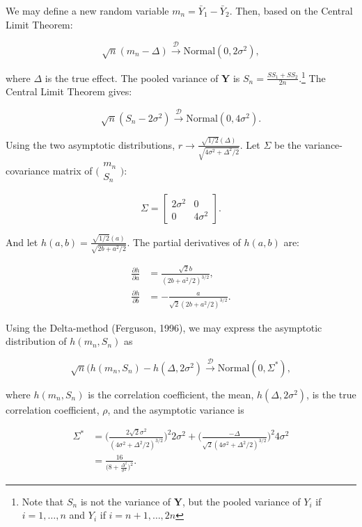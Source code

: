 \documentclass[english,,man]{apa6}
\begin{document}
We may define a new random variable \(m_n = \bar{Y}_1 - \bar{Y}_2\). Then, based on the Central Limit Theorem:

\[\sqrt{n}(m_n - \Delta) \stackrel{\mathscr{D}}{\rightarrow} \mbox{Normal}(0, 2 \sigma^2),\]

where \(\Delta\) is the true effect. The pooled variance of \(\mathbf{Y}\) is \(S_n = \frac{SS_1 + SS_2}{2n}\).\footnote{Note that \(S_n\) is not the variance of \(\mathbf{Y}\), but the pooled variance of \(Y_i\) if \(i = 1, \ldots, n\) and \(Y_i\) if \(i = n + 1, \ldots, 2n\)} The Central Limit Theorem gives:

\[\sqrt{n}(S_n - 2\sigma^2) \stackrel{\mathscr{D}}{\rightarrow} \mbox{Normal}(0, 4\sigma^2).\]

Using the two asymptotic distributions, \(r \rightarrow \frac{\sqrt{1/2}(\Delta)}{\sqrt{4\sigma^2 + \Delta^2/2}}\). Let \(\Sigma\) be the variance-covariance matrix of \(\big(\begin{smallmatrix} m_n\\ S_n \end{smallmatrix}\big)\):

\[\Sigma = 
\begin{bmatrix}
2\sigma^2 & 0\\
0 & 4\sigma^2
\end{bmatrix}.
\]

And let \(h(a, b) = \frac{\sqrt{1/2}(a)}{\sqrt{2b + a^2/2}}\). The partial derivatives of \(h(a, b)\) are:

\begin{align}
\frac{\partial h}{\partial a} &= \frac{\sqrt{2} b}{(2b + a^2/2)^{3/2}},\\
\frac{\partial h}{\partial b} &= -\frac{a}{\sqrt{2}(2b + a^2/2)^{3/2}}.
\end{align}

Using the Delta-method (Ferguson, 1996), we may express the asymptotic distribution of \(h(m_n, S_n)\) as

\[\sqrt{n}(h(m_n, S_n) - h(\Delta, 2\sigma^2) \stackrel{\mathscr{D}}{\rightarrow} \mbox{Normal}(0, \Sigma^*),\]

where \(h(m_n, S_n)\) is the correlation coefficient, the mean, \(h(\Delta, 2\sigma^2)\), is the true correlation coefficient, \(\rho\), and the asymptotic variance is

\begin{align*}
\Sigma^* &= \Big(\frac{2\sqrt{2} \sigma^2}{(4\sigma^2 + \Delta^2/2)^{3/2}}\Big)^2 2\sigma^2 + \Big(\frac{- \Delta}{\sqrt{2}(4\sigma^2 + \Delta^2/2)^{3/2}}\Big)^2 4\sigma^2 \\
&= \frac{16}{\big(8 + \frac{\Delta^2}{\sigma^2}\big)^2}.
\end{align*}
\end{document}
